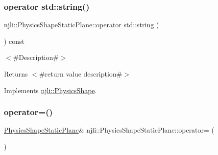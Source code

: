\subsubsection{\texorpdfstring{operator std\+::string()}{operator std::string()}}
{\footnotesize\ttfamily njli\+::\+Physics\+Shape\+Static\+Plane\+::operator std\+::string (\begin{DoxyParamCaption}{ }\end{DoxyParamCaption}) const\hspace{0.3cm}{\ttfamily [virtual]}}

$<$\#\+Description\#$>$

\begin{DoxyReturn}{Returns}
$<$\#return value description\#$>$ 
\end{DoxyReturn}


Implements \mbox{\hyperlink{classnjli_1_1_physics_shape_a890d915f88af06dcf1ac1fa4f5943dc2}{njli\+::\+Physics\+Shape}}.

\mbox{\label{classnjli_1_1_physics_shape_static_plane_a617dd0ea0639d4beda545af3f37b31da}} 
\subsubsection{\texorpdfstring{operator=()}{operator=()}}
{\footnotesize\ttfamily \mbox{\hyperlink{classnjli_1_1_physics_shape_static_plane}{Physics\+Shape\+Static\+Plane}}\& njli\+::\+Physics\+Shape\+Static\+Plane\+::operator= (\begin{DoxyParamCaption}\item[{const \mbox{\hyperlink{classnjli_1_1_physics_shape_static_plane}{Physics\+Shape\+Static\+Plane}} \&}]{ }\end{DoxyParamCaption})\hspace{0.3cm}{\ttfamily [protected]}}

\mbox{\label{classnjli_1_1_physics_shape_static_plane_a95e3b4c85db36869d5cb85487b88cbad}} 
